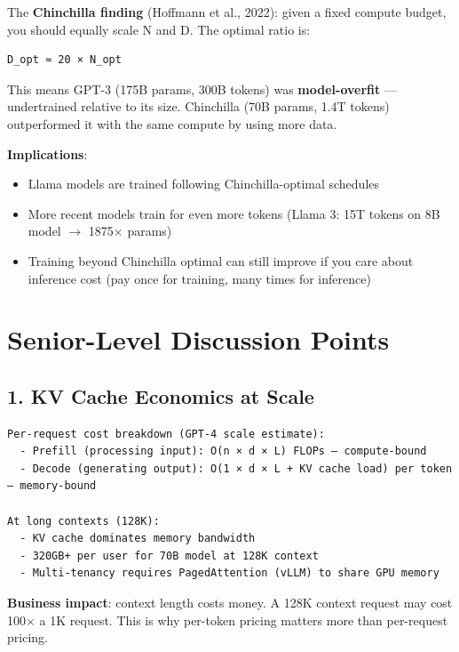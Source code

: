 \documentclass[11pt]{article}
\providecommand{\tightlist}{\setlength{\itemsep}{1pt}\setlength{\parskip}{0pt}}
\begin{document}
The \textbf{Chinchilla finding} (Hoffmann et al., 2022): given a fixed compute budget, you should equally scale N and D. The optimal ratio is:

\setcodelang{}

\begin{verbatim}
D_opt ≈ 20 × N_opt
\end{verbatim}

This means GPT-3 (175B params, 300B tokens) was \textbf{model-overfit} --- undertrained relative to its size. Chinchilla (70B params, 1.4T tokens) outperformed it with the same compute by using more data.

\textbf{Implications}:

\begin{itemize}
\tightlist
\item
  Llama models are trained following Chinchilla-optimal schedules
\item
  More recent models train for even more tokens (Llama 3: 15T tokens on 8B model \(\rightarrow\) 1875\(\times\) params)
\item
  Training beyond Chinchilla optimal can still improve if you care about inference cost (pay once for training, many times for inference)
\end{itemize}

\section{Senior-Level Discussion Points}\label{senior-level-discussion-points}

\subsection{1. KV Cache Economics at Scale}\label{1-kv-cache-economics-at-scale}

\setcodelang{}

\begin{verbatim}
Per-request cost breakdown (GPT-4 scale estimate):
  - Prefill (processing input): O(n × d × L) FLOPs — compute-bound
  - Decode (generating output): O(1 × d × L + KV cache load) per token — memory-bound

At long contexts (128K):
  - KV cache dominates memory bandwidth
  - 320GB+ per user for 70B model at 128K context
  - Multi-tenancy requires PagedAttention (vLLM) to share GPU memory
\end{verbatim}

\textbf{Business impact}: context length costs money. A 128K context request may cost 100\(\times\) a 1K request. This is why per-token pricing matters more than per-request pricing.
\end{document}

